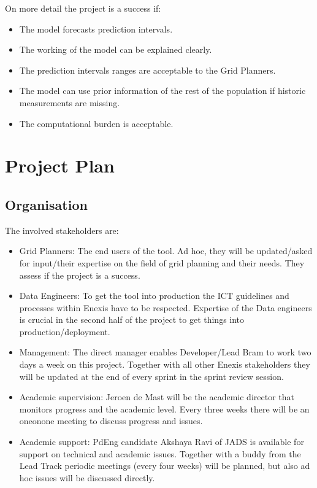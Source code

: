 \documentclass[letterpaper,10pt,english]{sphinxmanual}
\begin{document}
On more detail the project is a success if:
\begin{itemize}
\item {} 
The model forecasts prediction intervals.

\item {} 
The working of the model can be explained clearly.

\item {} 
The prediction intervals ranges are acceptable to the Grid Planners.

\item {} 
The model can use prior information of the rest of the population if historic measurements are missing.

\item {} 
The computational burden is acceptable.

\end{itemize}


\section{Project Plan}
\label{\detokenize{business_understanding:project-plan}}

\subsection{Organisation}
\label{\detokenize{business_understanding:organisation}}
The involved stakeholders are:
\begin{itemize}
\item {} 
Grid Planners: The end users of the tool. Ad hoc, they will be updated/asked for input/their expertise on the field of grid planning and their needs. They assess if the project is a success.

\item {} 
Data Engineers:  To get the tool into production the ICT guidelines and processes within Enexis have to be respected. Expertise of the Data engineers is crucial in the second half of the project to get things into production/deployment.

\item {} 
Management: The direct manager enables Developer/Lead Bram to work two days a week on this project. Together with all other Enexis stakeholders they will be updated at the end of every sprint in the sprint review session.

\item {} 
Academic supervision: Jeroen de Mast will be the academic director that monitors progress and the academic level. Every three weeks there will be an one\sphinxhyphen{}on\sphinxhyphen{}one meeting to discuss progress and issues.

\item {} 
Academic support: PdEng candidate Akshaya Ravi of JADS is available for support on technical and academic issues. Together with a buddy from the Lead Track periodic meetings (every four weeks) will be planned, but also ad hoc issues will be discussed directly.

\end{itemize}
\end{document}
